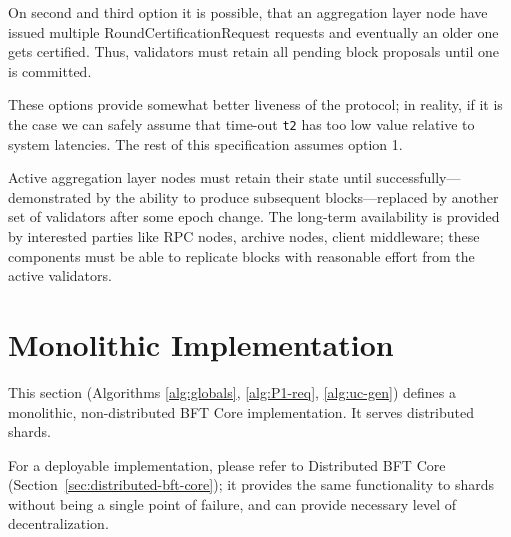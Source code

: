 On second and third option it is possible, that an aggregation layer node have issued multiple RoundCertificationRequest requests and eventually an older one gets certified. Thus, validators must retain all pending block proposals until one is committed.

These options provide somewhat better liveness of the protocol; in reality, if it is the case we can safely assume that time-out \texttt{t2} has too low value relative to system latencies. The rest of this specification assumes option 1.

Active aggregation layer nodes must retain their state until successfully---demonstrated by the ability to produce subsequent blocks---replaced by another set of validators after some epoch change. The long-term availability is provided by interested parties like RPC nodes, archive nodes, client middleware; these components must be able to replicate blocks with reasonable effort from the active validators.

\section{Monolithic Implementation}

This section (Algorithms \ref{alg:globals}, \ref{alg:P1-req}, \ref{alg:uc-gen}) defines a monolithic, non-distributed BFT Core implementation. It serves distributed shards.

For a deployable implementation, please refer to Distributed BFT Core (Section~\ref{sec:distributed-bft-core}); it provides the same functionality to shards without being a single point of failure, and can provide necessary level of decentralization.

